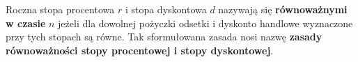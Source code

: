 \documentclass{article}
\begin{document}
Roczna stopa procentowa $ r $ i stopa dyskontowa $ d $ nazywają się \textbf{równoważnymi w czasie} $ n $ jeżeli dla dowolnej pożyczki odsetki i dyskonto handlowe wyznaczone przy tych stopach są równe. Tak sformułowana zasada nosi nazwę \textbf{zasady równoważności stopy procentowej i stopy dyskontowej}.








%		
\end{document}
